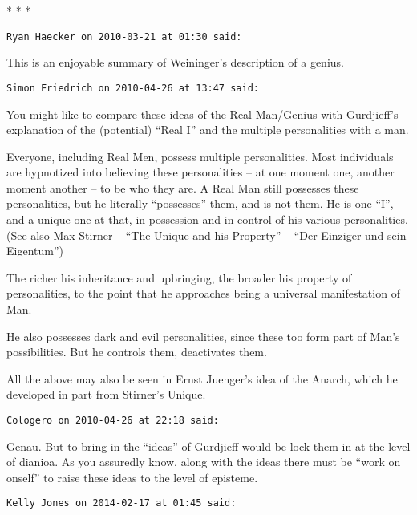 \hfill


\begin{center}* * *\end{center}

\begin{footnotesize}\begin{sffamily}


\hfill

\texttt{Ryan Haecker on 2010-03-21 at 01:30 said: }

This is an enjoyable summary of Weininger's description of a genius.


\hfill

\texttt{Simon Friedrich on 2010-04-26 at 13:47 said: }

You might like to compare these ideas of the Real Man/Genius with Gurdjieff's explanation of the (potential) “Real I” and the multiple personalities with a man. 

Everyone, including Real Men, possess multiple personalities. Most individuals are hypnotized into believing these personalities – at one moment one, another moment another – to be who they are. A Real Man still possesses these personalities, but he literally “possesses” them, and is not them. He is one “I”, and a unique one at that, in possession and in control of his various personalities. (See also Max Stirner – “The Unique and his Property” – “Der Einziger und sein Eigentum”)

The richer his inheritance and upbringing, the broader his property of personalities, to the point that he approaches being a universal manifestation of Man.

He also possesses dark and evil personalities, since these too form part of Man's possibilities. But he controls them, deactivates them.

All the above may also be seen in Ernst Juenger's idea of the Anarch, which he developed in part from Stirner's Unique.


\hfill

\texttt{Cologero on 2010-04-26 at 22:18 said: }

Genau. But to bring in the “ideas” of Gurdjieff would be lock them in at the level of dianioa. As you assuredly know, along with the ideas there must be “work on onself” to raise these ideas to the level of episteme.


\hfill

\texttt{Kelly Jones on 2014-02-17 at 01:45 said: }


\end{sffamily}
\end{footnotesize}
